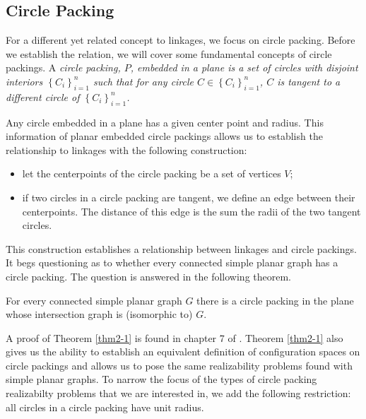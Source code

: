 \subsection{Circle Packing}
For a different yet related concept to linkages, we focus on circle packing.  Before we establish the relation, we will cover some fundamental concepts of circle packings.  A \it{circle packing}, $P$, embedded in a plane  is a set of circles with disjoint interiors $\left\lbrace C_i \right\rbrace_{i = 1}^n $ such that for any circle $C \in \left\lbrace C_i \right\rbrace_{i = 1}^n$, $C$ is tangent to a different circle of $\left\lbrace C_i \right\rbrace_{i = 1}^n$. 

Any circle embedded in a plane has a given center point and radius.  This information of planar embedded circle packings allows us to establish the relationship to linkages with the following construction:
\begin{itemize}
\item[\rn{1}] let the centerpoints of the circle packing be a set of vertices $V$;
\item[\rn{2}] if two circles in a circle packing are tangent, we define an edge between their centerpoints.  The distance of this edge is the sum the radii of the two tangent circles.
\end{itemize}  
This construction establishes a relationship between linkages and circle packings.  It begs questioning as to whether every connected simple planar graph has a circle packing.  The question is answered in the following theorem.
\begin{thm}\label{thm2-1}
For every connected simple planar graph $G$ there is a circle packing in the
plane whose intersection graph is (isomorphic to) $G$.
\end{thm}
A proof of Theorem \ref{thm2-1} is found in chapter 7 of \cite{stephenson2005introduction}.  Theorem \ref{thm2-1} also gives us the ability to establish an equivalent definition of configuration spaces on circle packings and allows us to pose the same realizability problems found with simple planar graphs.  To narrow the focus of the types of circle packing realizabilty problems that we are interested in, we add the following restriction: all circles in a circle packing have unit radius. 

